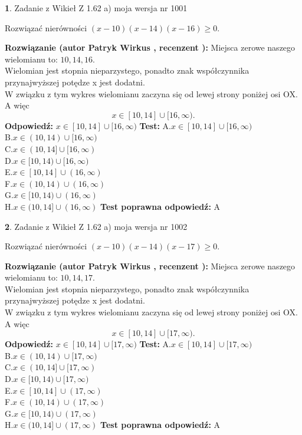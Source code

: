 \documentclass[12pt, a4paper]{article}
\theoremstyle{definition} %
\newtheorem{zad}{}
\newcommand{\zadStart}[1]{\begin{zad}#1\newline}
\newcommand{\zadStop}{\end{zad}}
\newcommand{\rozwStart}[2]{\noindent \textbf{Rozwiązanie (autor #1 , recenzent #2): }\newline}
\newcommand{\rozwStop}{\newline}
\newcommand{\odpStart}{\noindent \textbf{Odpowiedź:}\newline}
\newcommand{\odpStop}{\newline}
\newcommand{\testStart}{\noindent \textbf{Test:}\newline}
\newcommand{\testStop}{\newline}
\newcommand{\kluczStart}{\noindent \textbf{Test poprawna odpowiedź:}\newline}
\newcommand{\kluczStop}{\newline}
\begin{document}
\zadStart{Zadanie z Wikieł Z 1.62 a) moja wersja nr 1001}

Rozwiązać nierówności $(x-10)(x-14)(x-16)\ge0$.
\zadStop
\rozwStart{Patryk Wirkus}{}
Miejsca zerowe naszego wielomianu to: $10, 14, 16$.\\
Wielomian jest stopnia nieparzystego, ponadto znak współczynnika przy\linebreak najwyższej potędze x jest dodatni.\\ W związku z tym wykres wielomianu zaczyna się od lewej strony poniżej osi OX. A więc $$x \in [10,14] \cup [16,\infty).$$
\rozwStop
\odpStart
$x \in [10,14] \cup [16,\infty)$
\odpStop
\testStart
A.$x \in [10,14] \cup [16,\infty)$\\
B.$x \in (10,14) \cup [16,\infty)$\\
C.$x \in (10,14] \cup [16,\infty)$\\
D.$x \in [10,14) \cup [16,\infty)$\\
E.$x \in [10,14] \cup (16,\infty)$\\
F.$x \in (10,14) \cup (16,\infty)$\\
G.$x \in [10,14) \cup (16,\infty)$\\
H.$x \in (10,14] \cup (16,\infty)$
\testStop
\kluczStart
A
\kluczStop



\zadStart{Zadanie z Wikieł Z 1.62 a) moja wersja nr 1002}

Rozwiązać nierówności $(x-10)(x-14)(x-17)\ge0$.
\zadStop
\rozwStart{Patryk Wirkus}{}
Miejsca zerowe naszego wielomianu to: $10, 14, 17$.\\
Wielomian jest stopnia nieparzystego, ponadto znak współczynnika przy\linebreak najwyższej potędze x jest dodatni.\\ W związku z tym wykres wielomianu zaczyna się od lewej strony poniżej osi OX. A więc $$x \in [10,14] \cup [17,\infty).$$
\rozwStop
\odpStart
$x \in [10,14] \cup [17,\infty)$
\odpStop
\testStart
A.$x \in [10,14] \cup [17,\infty)$\\
B.$x \in (10,14) \cup [17,\infty)$\\
C.$x \in (10,14] \cup [17,\infty)$\\
D.$x \in [10,14) \cup [17,\infty)$\\
E.$x \in [10,14] \cup (17,\infty)$\\
F.$x \in (10,14) \cup (17,\infty)$\\
G.$x \in [10,14) \cup (17,\infty)$\\
H.$x \in (10,14] \cup (17,\infty)$
\testStop
\kluczStart
A
\kluczStop
\end{document}
